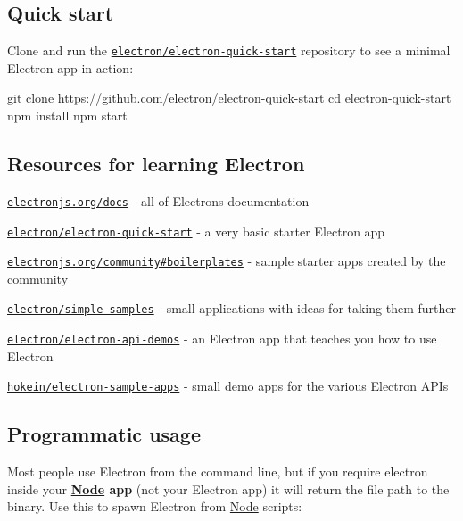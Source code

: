 \subsection*{Quick start}

Clone and run the \href{https://github.com/electron/electron-quick-start}{\tt electron/electron-\/quick-\/start} repository to see a minimal Electron app in action\+:


\begin{DoxyCode}
git clone https://github.com/electron/electron-quick-start
cd electron-quick-start
npm install
npm start
\end{DoxyCode}


\subsection*{Resources for learning Electron}


\begin{DoxyItemize}
\item \href{https://electronjs.org/docs}{\tt electronjs.\+org/docs} -\/ all of Electron\textquotesingle{}s documentation
\item \href{https://github.com/electron/electron-quick-start}{\tt electron/electron-\/quick-\/start} -\/ a very basic starter Electron app
\item \href{https://electronjs.org/community#boilerplates}{\tt electronjs.\+org/community\#boilerplates} -\/ sample starter apps created by the community
\item \href{https://github.com/electron/simple-samples}{\tt electron/simple-\/samples} -\/ small applications with ideas for taking them further
\item \href{https://github.com/electron/electron-api-demos}{\tt electron/electron-\/api-\/demos} -\/ an Electron app that teaches you how to use Electron
\item \href{https://github.com/hokein/electron-sample-apps}{\tt hokein/electron-\/sample-\/apps} -\/ small demo apps for the various Electron A\+P\+Is
\end{DoxyItemize}

\subsection*{Programmatic usage}

Most people use Electron from the command line, but if you require {\ttfamily electron} inside your {\bfseries \mbox{\hyperlink{classNode}{Node}} app} (not your Electron app) it will return the file path to the binary. Use this to spawn Electron from \mbox{\hyperlink{classNode}{Node}} scripts\+:


